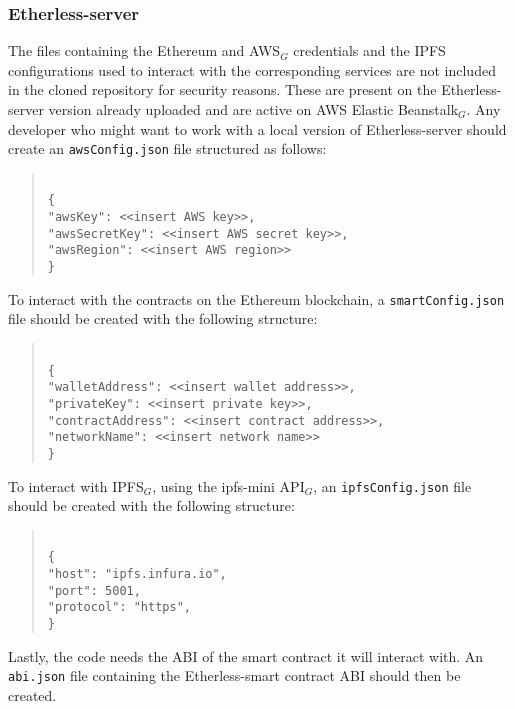 \subsubsection{Etherless-server}
The files containing the Ethereum and AWS$_{G}$ credentials and the IPFS configurations used to interact with the corresponding services are not included in the cloned repository for security reasons. These are present on the Etherless-server version already uploaded and are active on AWS Elastic Beanstalk$_{G}$.
Any developer who might want to work with a local version of Etherless-server should create an \texttt{awsConfig.json} file structured as follows:
\begin{quote}
	\texttt{ \\
		\{\\
		"awsKey": <<insert AWS key>>, \\
		"awsSecretKey": <<insert AWS secret key>>, \\
		"awsRegion": <<insert AWS region>> \\
		\}\\
	}
\end{quote}
To interact with the contracts on the Ethereum blockchain, a \texttt{smartConfig.json} file should be created with the following structure:
\begin{quote}
	\texttt{ \\
		\{\\
		"walletAddress": <<insert wallet address>>, \\
		"privateKey": <<insert private key>>, \\
		"contractAddress": <<insert contract address>>, \\
		"networkName": <<insert network name>> \\
		\}\\
	}
\end{quote}
To interact with IPFS$_{G}$, using the ipfs-mini API$_{G}$, an \texttt{ipfsConfig.json} file should be created with the following structure:
\begin{quote}
	\texttt{ \\
		\{\\
		"host": "ipfs.infura.io", \\
		"port": 5001, \\
		"protocol": "https", \\
		\}\\
	}
\end{quote}
Lastly, the code needs the ABI of the smart contract it will interact with. An \texttt{abi.json} file containing the Etherless-smart contract ABI should then be created.
